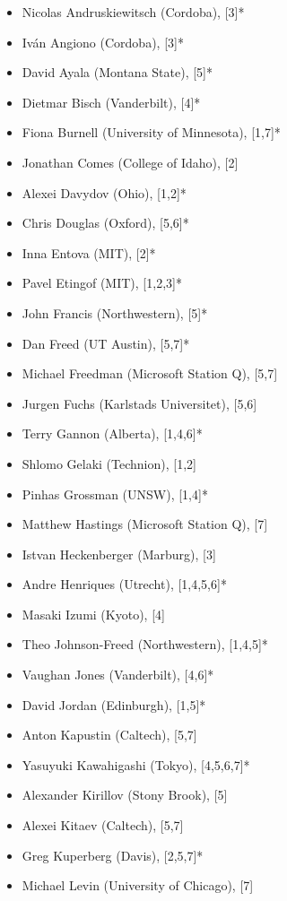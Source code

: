 \documentclass[12pt]{article}
\begin{document}
\begin{multicols}{2}
\begin{itemize}
  \setlength{\itemsep}{1pt}
  \setlength{\parskip}{0pt}
  \setlength{\parsep}{0pt}
\item Nicolas Andruskiewitsch (Cordoba), [3]*
\item Iv\'an Angiono (Cordoba), [3]*
\item David Ayala (Montana State), [5]*
\item Dietmar Bisch (Vanderbilt), [4]*
\item Fiona Burnell (University of Minnesota), [1,7]*
\item Jonathan Comes (College of Idaho), [2]
\item Alexei Davydov (Ohio), [1,2]*
\item Chris Douglas (Oxford), [5,6]*
\item Inna Entova (MIT), [2]*
\item Pavel Etingof (MIT), [1,2,3]*
\item John Francis (Northwestern), [5]*
\item Dan Freed (UT Austin), [5,7]*
\item Michael Freedman (Microsoft Station Q), [5,7]
\item Jurgen Fuchs (Karlstads Universitet), [5,6]
\item Terry Gannon (Alberta), [1,4,6]*
\item Shlomo Gelaki (Technion), [1,2]
\item Pinhas Grossman (UNSW), [1,4]*
\item Matthew Hastings (Microsoft Station Q), [7]
\item Istvan Heckenberger (Marburg), [3]
\item Andre Henriques (Utrecht), [1,4,5,6]*
\item Masaki Izumi (Kyoto), [4]
\item Theo Johnson-Freed (Northwestern), [1,4,5]*
\item Vaughan Jones (Vanderbilt), [4,6]*
\item David Jordan (Edinburgh), [1,5]*
\item Anton Kapustin (Caltech), [5,7]
\item Yasuyuki Kawahigashi (Tokyo), [4,5,6,7]*
\item Alexander Kirillov (Stony Brook), [5]
\item Alexei Kitaev (Caltech), [5,7]
\item Greg Kuperberg (Davis), [2,5,7]*
\item Michael Levin (University of Chicago), [7]

\end{itemize}
\end{multicols}
\end{document}
